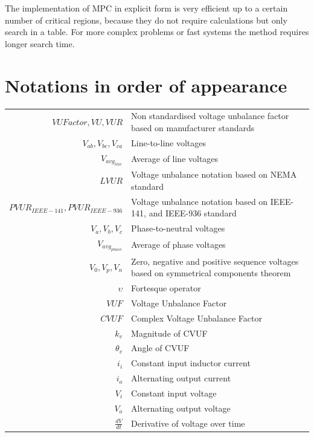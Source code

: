 The implementation of MPC in explicit form is very efficient up to a certain number of critical regions, because they do not require calculations but only search in a table. For more complex problems or fast systems the method requires longer search time.

\section{Notations in order of appearance}
\begin{longtable}{r l}
  $VUFactor,VU,VUR$                	& Non standardised voltage unbalance factor based on manufacturer standards\\\
	$V_{ab},V_{bc},V_{ca}$  					& Line-to-line voltages\\
	$V_{avg_{line}}$  								& Average of line voltages\\
	$LVUR$														& Voltage unbalance notation based on NEMA standard\\
	$PVUR_{IEEE-141},PVUR_{IEEE-936}$	& Voltage unbalance notation based on IEEE-141, and IEEE-936 standard\\
	$V_{a},V_{b},V_{c}$  							& Phase-to-neutral voltages\\
	$V_{avg_{phase}}$  								& Average of phase voltages\\
	$V_{0},V_{p},V_{n}$  							& Zero, negative and positive sequence voltages based on symmetrical components theorem\\
  $\upsilon$  											& Fortesque operator\\
	$VUF$  														& Voltage Unbalance Factor\\
	$CVUF$  													& Complex Voltage Unbalance Factor\\
	$k_v$  														& Magnitude of CVUF\\
	$\theta_v$  											& Angle of CVUF\\
	$i_i$															& Constant input inductor current\\
	$i_o$															& Alternating output current\\
	$V_i$															& Constant input voltage\\
	$V_o$															& Alternating output voltage\\
	$\frac{dV}{dt}$										& Derivative of voltage over time\\

\end{longtable}
